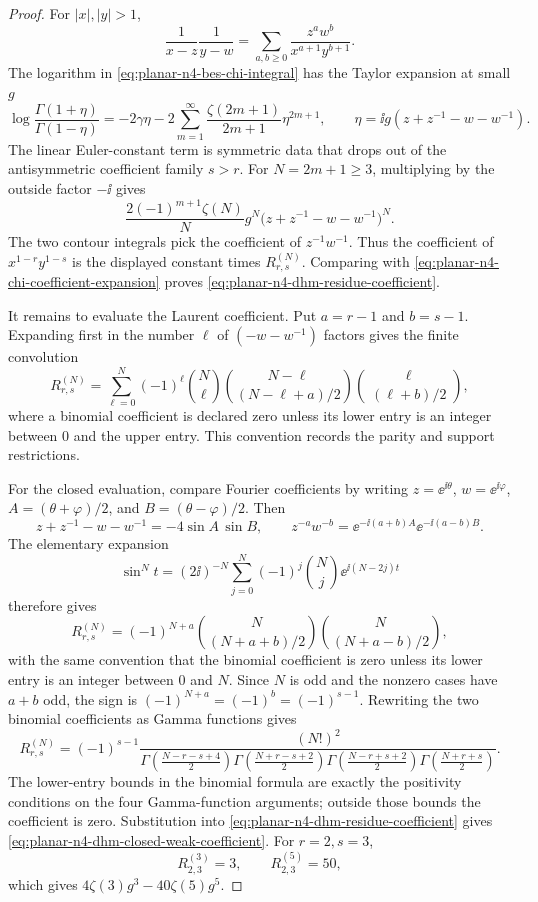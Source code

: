 \begin{proof}
For \(|x|,|y|>1\),
\[
  \frac{1}{x-z}\frac{1}{y-w}
  =
  \sum_{a,b\geq0}\frac{z^aw^b}{x^{a+1}y^{b+1}} .
\]
The logarithm in \eqref{eq:planar-n4-bes-chi-integral} has the Taylor
expansion at small \(g\)
\[
  \log\frac{\Gamma(1+\eta)}{\Gamma(1-\eta)}
  =
  -2\gamma\eta
  -
  2\sum_{m=1}^{\infty}
  \frac{\zeta(2m+1)}{2m+1}\eta^{2m+1},
  \qquad
  \eta=\ii g(z+z^{-1}-w-w^{-1}).
\]
The linear Euler-constant term is symmetric data that drops out of the
antisymmetric coefficient family \(s>r\).  For \(N=2m+1\geq3\), multiplying by
the outside factor \(-\ii\) gives
\[
  \frac{2(-1)^{m+1}\zeta(N)}{N}
  g^N
  \bigl(z+z^{-1}-w-w^{-1}\bigr)^N .
\]
The two contour integrals pick the coefficient of \(z^{-1}w^{-1}\).  Thus the
coefficient of \(x^{1-r}y^{1-s}\) is the displayed constant times
\(R^{(N)}_{r,s}\).  Comparing with
\eqref{eq:planar-n4-chi-coefficient-expansion} proves
\eqref{eq:planar-n4-dhm-residue-coefficient}.

It remains to evaluate the Laurent coefficient.  Put
\(a=r-1\) and \(b=s-1\).  Expanding first in the number \(\ell\) of
\((-w-w^{-1})\) factors gives the finite convolution
\begin{equation}
  R^{(N)}_{r,s}
  =
  \sum_{\ell=0}^{N}
  (-1)^\ell
  \binom{N}{\ell}
  \binom{N-\ell}{(N-\ell+a)/2}
  \binom{\ell}{(\ell+b)/2},
  \label{eq:planar-n4-dhm-residue-binomial-sum}
\end{equation}
where a binomial coefficient is declared zero unless its lower entry is an
integer between \(0\) and the upper entry.  This convention records the parity
and support restrictions.

For the closed evaluation, compare Fourier coefficients by writing
\(z=\ee^{\ii\theta}\), \(w=\ee^{\ii\varphi}\),
\(A=(\theta+\varphi)/2\), and \(B=(\theta-\varphi)/2\).  Then
\[
  z+z^{-1}-w-w^{-1}
  =
  -4\sin A\,\sin B,
  \qquad
  z^{-a}w^{-b}=\ee^{-\ii(a+b)A}\ee^{-\ii(a-b)B}.
\]
The elementary expansion
\[
  \sin^N t
  =
  (2\ii)^{-N}
  \sum_{j=0}^{N}
  (-1)^j\binom{N}{j}\ee^{\ii(N-2j)t}
\]
therefore gives
\[
  R^{(N)}_{r,s}
  =
  (-1)^{N+a}
  \binom{N}{(N+a+b)/2}
  \binom{N}{(N+a-b)/2},
\]
with the same convention that the binomial coefficient is zero unless its
lower entry is an integer between \(0\) and \(N\).  Since \(N\) is odd and the
nonzero cases have \(a+b\) odd, the sign is
\((-1)^{N+a}=(-1)^b=(-1)^{s-1}\).  Rewriting the two binomial coefficients as
Gamma functions gives
\[
  R^{(N)}_{r,s}
  =
  (-1)^{s-1}
  \frac{(N!)^2}{
    \Gamma\!\left(\frac{N-r-s+4}{2}\right)
    \Gamma\!\left(\frac{N+r-s+2}{2}\right)
    \Gamma\!\left(\frac{N-r+s+2}{2}\right)
    \Gamma\!\left(\frac{N+r+s}{2}\right)
  } .
\]
The lower-entry bounds in the binomial formula are exactly the positivity
conditions on the four Gamma-function arguments; outside those bounds the
coefficient is zero.  Substitution into
\eqref{eq:planar-n4-dhm-residue-coefficient} gives
\eqref{eq:planar-n4-dhm-closed-weak-coefficient}.  For \(r=2,s=3\),
\[
  R^{(3)}_{2,3}=3,\qquad R^{(5)}_{2,3}=50,
\]
which gives \(4\zeta(3)g^3-40\zeta(5)g^5\).
\end{proof}

